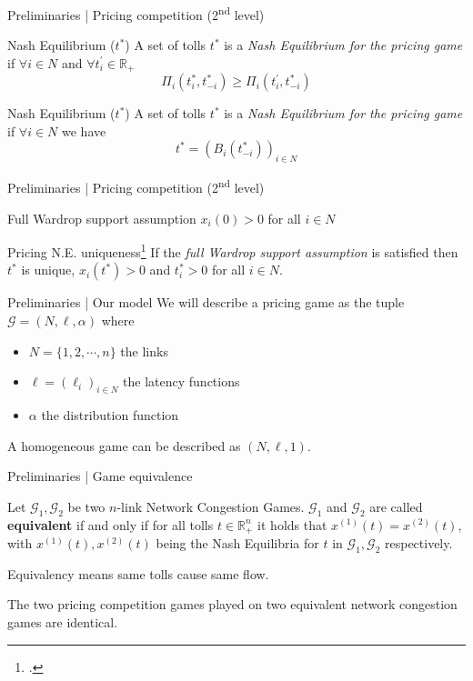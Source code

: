 \documentclass[handout]{beamer}
\newcommand{\R}{\mathbb{R}}
\newcommand{\Gm}{\mathcal{G}}
\begin{document}
\begin{frame}{Preliminaries | Pricing competition (2\textsuperscript{nd} level)}
	\begin{block}{Nash Equilibrium ($t^*$)}
		A set of tolls $t^*$ is a \textit{Nash Equilibrium for the pricing game} if $\forall i \in N$ and $\forall t_i^\prime \in \R_+$
		\[\Pi_i(t_i^*, t_{-i}^*) \geq \Pi_i(t_i^\prime, t_{-i}^*)\]
	\end{block}
	\begin{block}{Nash Equilibrium ($t^*$)}
		A set of tolls $t^*$ is a \textit{Nash Equilibrium for the pricing game} if
		$\forall i \in N$ we have
		\[t^* = (B_i(t_{-i}^*))_{i \in N}\]
	\end{block}
\end{frame}

\begin{frame}{Preliminaries | Pricing competition (2\textsuperscript{nd} level)}
	\begin{block}{Full Wardrop support assumption}
		$x_i(0) > 0$ for all $i \in N$
	\end{block}
	\begin{block}{Pricing N.E. uniqueness\footcite{Harks_2019}}
		If the \textit{full Wardrop support assumption} is satisfied then $t^*$ is unique, $x_i(t^*) > 0$ and $t_i^* > 0$ for all $i \in N$.
	\end{block}
\end{frame}

\begin{frame}{Preliminaries | Our model}
	We will describe a pricing game as the tuple $\Gm = (N, \ell, \alpha)$ where
	\begin{itemize}
		\item $N = \{1, 2, \cdots, n\}$ the links
		\item $\ell = (\ell_i)_{i \in N}$ the latency functions
		\item $\alpha$ the distribution function
	\end{itemize}\pause
	A homogeneous game can be described as $(N, \ell, 1)$.
\end{frame}

\begin{frame}{Preliminaries | Game equivalence}
	\begin{definition}
		Let $\Gm_1, \Gm_2$ be two $n$-link Network Congestion Games.
		$\Gm_1$ and $\Gm_2$ are called \textbf{equivalent} if and only if for all tolls $t \in \R_+^n$ it holds that $x^{(1)}(t) = x^{(2)}(t)$, with $x^{(1)}(t), x^{(2)}(t)$ being the Nash Equilibria for $t$ in $\Gm_1, \Gm_2$ respectively.
	\end{definition}
	Equivalency means same tolls cause same flow.\pause

	The two pricing competition games played on two equivalent network congestion games are identical.
\end{frame}
\end{document}
